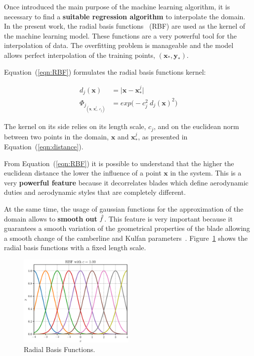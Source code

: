 Once introduced the main purpose of the machine learning algorithm, it is necessary to find a \textbf{suitable regression algorithm}
to interpolate the domain. In the present work, the radial basis functions~\cite{hensman2013gaussian} (RBF) are used as the kernel 
of the machine learning model. These functions are a very powerful tool for the interpolation of data. 
The overfitting problem is manageable and the model allows perfect interpolation of the training points, $(\boldsymbol{x}_{*}, \boldsymbol{y}_{*})$.

Equation~(\ref{eqn:RBF}) formulates the radial basis functions kernel:

\begin{align}
    d_j (\boldsymbol{x}) & = \lvert \boldsymbol{x} - \boldsymbol{x}^j_* \lvert \label{eqn:distance} \\
    \Phi_{j_{ ( \boldsymbol{x}, \ \boldsymbol{x}^j_*, \ c_j ) }} & = exp \big( -c^2_j \ d_j (\boldsymbol{x})^2 \big) \label{eqn:RBF} 
\end{align}

The kernel on its side relies on its length scale, $c_j$, and on the euclidean norm
between two points in the domain, $\boldsymbol{x}$ and $\boldsymbol{x}^{j}_*$, 
as presented in Equation~(\ref{eqn:distance}). 

From Equation~(\ref{eqn:RBF}) it is possible to understand that the higher the euclidean 
distance the lower the influence of a point $\boldsymbol{x}$ in the system. 
This is a very \textbf{powerful feature} because it decorrelates blades which define
aerodynamic duties and aerodynamic styles that are completely different.

At the same time, the usage of gaussian functions for the approximation of the domain
allows to \textbf{smooth out} $\hat{\mathnormal{f}}$. This feature is very important because it 
guarantees a smooth variation of the geometrical properties of the blade allowing a 
smooth change of the camberline and Kulfan parameters~\cite{duvenaud2014kernel}.
Figure~\ref{fig:RBF} shows the radial basis functions with a fixed length scale.

\begin{figure}[H]
    \centering
    \includegraphics[width=0.5\textwidth]{./pyFigure/figures/RBF.eps}
    \caption{Radial Basis Functions.}
    \label{fig:RBF}
\end{figure}

